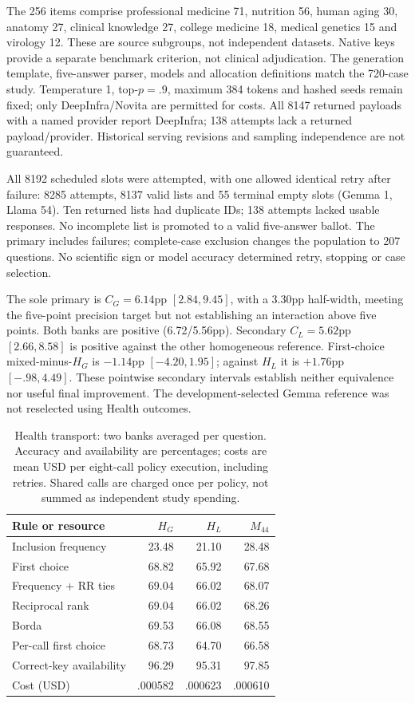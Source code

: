 The 256 items comprise professional medicine 71, nutrition 56, human aging 30, anatomy 27, clinical knowledge 27, college medicine 18, medical genetics 15 and virology 12. These are source subgroups, not independent datasets. Native keys provide a separate benchmark criterion, not clinical adjudication. The generation template, five-answer parser, models and allocation definitions match the 720-case study. Temperature 1, top-$p=.9$, maximum 384 tokens and hashed seeds remain fixed; only DeepInfra/Novita are permitted for costs. All 8147 returned payloads with a named provider report DeepInfra; 138 attempts lack a returned payload/provider. Historical serving revisions and sampling independence are not guaranteed.

All 8192 scheduled slots were attempted, with one allowed identical retry after failure: 8285 attempts, 8137 valid lists and 55 terminal empty slots (Gemma 1, Llama 54). Ten returned lists had duplicate IDs; 138 attempts lacked usable responses. No incomplete list is promoted to a valid five-answer ballot. The primary includes failures; complete-case exclusion changes the population to 207 questions. No scientific sign or model accuracy determined retry, stopping or case selection.

The sole primary is $C_G=6.14$pp $[2.84,9.45]$, with a 3.30pp half-width, meeting the five-point precision target but not establishing an interaction above five points. Both banks are positive (6.72/5.56pp). Secondary $C_L=5.62$pp $[2.66,8.58]$ is positive against the other homogeneous reference. First-choice mixed-minus-$H_G$ is $-1.14$pp $[-4.20,1.95]$; against $H_L$ it is $+1.76$pp $[-.98,4.49]$. These pointwise secondary intervals establish neither equivalence nor useful final improvement. The development-selected Gemma reference was not reselected using Health outcomes.

\begin{table}[h]
\centering\small
\caption{Health transport: two banks averaged per question. Accuracy and availability are percentages; costs are mean USD per eight-call policy execution, including retries. Shared calls are charged once per policy, not summed as independent study spending.}
\label{tab:health_absolute}
\begin{tabular}{lrrr}
\toprule
Rule or resource & $H_G$ & $H_L$ & $M_{44}$\\
\midrule
Inclusion frequency &23.48&21.10&28.48\\
First choice &68.82&65.92&67.68\\
Frequency + RR ties &69.04&66.02&68.07\\
Reciprocal rank &69.04&66.02&68.26\\
Borda &69.53&66.08&68.55\\
Per-call first choice &68.73&64.70&66.58\\
Correct-key availability &96.29&95.31&97.85\\
Cost (USD) &.000582&.000623&.000610\\
\bottomrule
\end{tabular}
\end{table}

